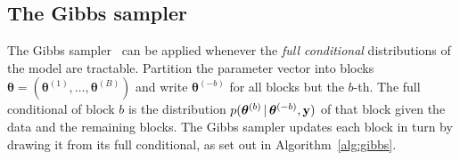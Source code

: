 \subsection{The Gibbs sampler}
\label{sec:gibbs}

The Gibbs sampler~\citep{geman1984gibbs, casella1992gibbs} can be applied
whenever the \emph{full conditional} distributions of the model are
tractable. Partition the parameter vector into blocks
$\bm{\theta} = (\bm{\theta}^{(1)}, \dots, \bm{\theta}^{(B)})$ and
write $\bm{\theta}^{(-b)}$ for all blocks but the $b$-th. The full
conditional of block $b$ is the distribution
$p(\bm{\theta}^{(b)} \,|\, \bm{\theta}^{(-b)}, \mathbf{y})$ of that
block given the data and the remaining blocks. The Gibbs sampler
updates each block in turn by drawing it from its full conditional, as
set out in Algorithm~\ref{alg:gibbs}.

\begin{algorithm}[H]
\caption{Gibbs sampler (systematic scan)}
\label{alg:gibbs}
\end{algorithm}

